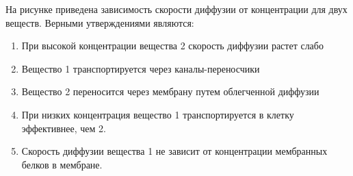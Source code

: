 
На рисунке приведена зависимость скорости
диффузии от концентрации для двух веществ. Верными утверждениями являются:


\begin{enumerate}
    \item При высокой концентрации вещества 2 скорость диффузии растет слабо
    \item Вещество 1 транспортируется через каналы-переносчики
    \item Вещество 2 переносится через мембрану путем облегченной диффузии
    \item При низких концентрация вещество 1 транспортируется в клетку эффективнее, чем 2.
    \item Скорость диффузии вещества 1 не зависит от концентрации мембранных белков в мембране.
\end{enumerate}


\explanationSection

